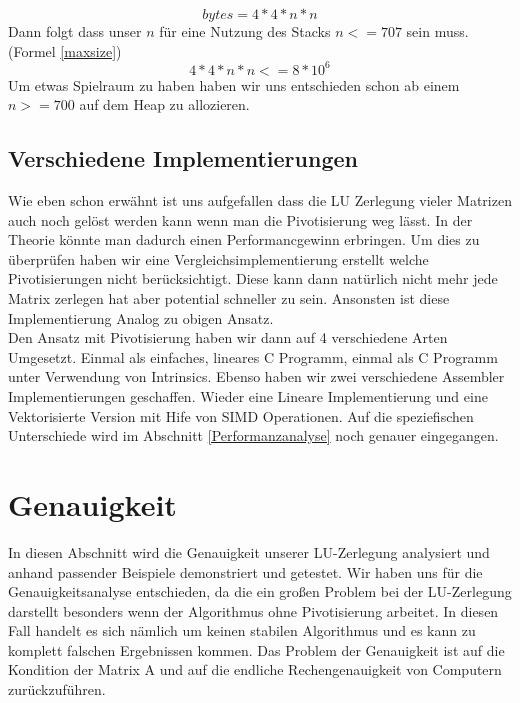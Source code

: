 \documentclass[course=erap]{aspdoc}
\begin{document}
 \begin{equation}
 \label{size}
  bytes = 4*4*n*n
 \end{equation}
Dann folgt dass unser $n$ für eine Nutzung des Stacks  $n <= 707$  sein muss.(Formel \ref{maxsize})
 \begin{equation}
 \label{maxsize}
  4*4*n*n <= 8*10^6
 \end{equation}
 Um etwas Spielraum zu haben haben wir uns entschieden schon ab einem $n >= 700$ auf dem Heap zu allozieren.\\


\subsection{Verschiedene Implementierungen}
Wie eben schon erwähnt ist uns aufgefallen dass die LU Zerlegung vieler Matrizen auch noch gelöst werden kann wenn man die Pivotisierung weg lässt. In der Theorie könnte man dadurch einen Performancgewinn erbringen. 
Um dies zu überprüfen haben wir eine Vergleichsimplementierung erstellt welche Pivotisierungen nicht berücksichtigt. Diese kann dann natürlich nicht mehr jede Matrix zerlegen hat aber potential schneller zu sein.
  Ansonsten ist diese Implementierung Analog zu obigen Ansatz.\\
  
Den Ansatz mit Pivotisierung haben wir dann auf 4 verschiedene Arten Umgesetzt. Einmal als einfaches, lineares C Programm, einmal als C Programm unter Verwendung von Intrinsics.
 Ebenso haben wir zwei verschiedene Assembler Implementierungen geschaffen. Wieder eine Lineare Implementierung und eine Vektorisierte Version mit Hife von SIMD Operationen.
 Auf die speziefischen Unterschiede wird im Abschnitt \ref{Performanzanalyse} noch genauer eingegangen.


\section{Genauigkeit}
In diesen Abschnitt wird die Genauigkeit unserer LU-Zerlegung analysiert und anhand
 passender Beispiele demonstriert und getestet. Wir haben uns für die 
Genauigkeitsanalyse entschieden, da die ein großen Problem bei der LU-Zerlegung
 darstellt besonders wenn der Algorithmus ohne Pivotisierung arbeitet. In diesen Fall 
handelt es sich nämlich um keinen stabilen Algorithmus und es kann zu komplett 
falschen Ergebnissen kommen. Das Problem der Genauigkeit ist auf die Kondition der 
Matrix A und auf die endliche Rechengenauigkeit von Computern zurückzuführen. \\
\end{document}
